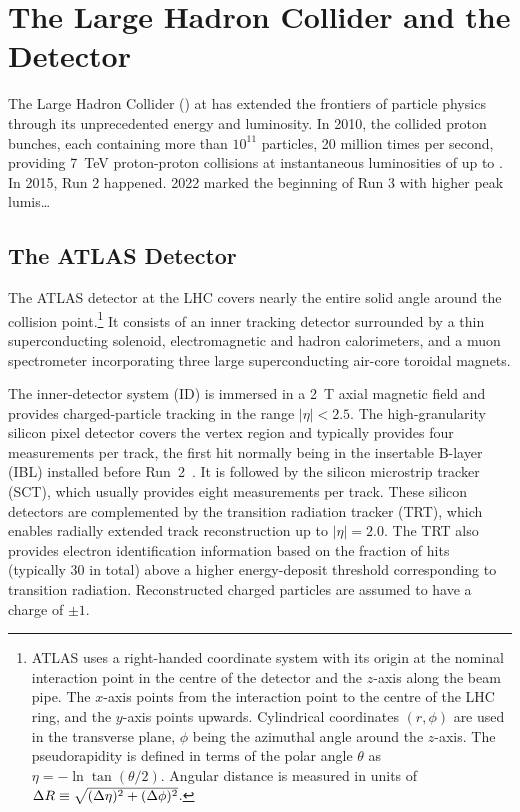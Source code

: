 \chapter{The Large Hadron Collider and the \ATLAS Detector}\label{chap:lhc_atlas}

The Large Hadron Collider (\LHC) at \CERN has extended the frontiers of particle physics through its unprecedented energy and luminosity.
In 2010, the \LHC collided proton bunches, each containing more than $10^{11}$ particles, 20 million times per second, providing \SI{7}{\TeV} proton-proton collisions at instantaneous luminosities of up to \peakLumi.
In 2015, Run 2 happened.
2022 marked the beginning of Run 3 with higher peak lumis\dots


\section{The ATLAS Detector}\label{sec:atlas_detector}

\newcommand{\AtlasCoordFootnote}{%
ATLAS uses a right-handed coordinate system with its origin at the nominal interaction point in the centre of the detector and the \(z\)-axis along the beam pipe. The \(x\)-axis points from the interaction point to the centre of the LHC ring, and the \(y\)-axis points upwards. Cylindrical coordinates \((r,\phi)\) are used in the transverse plane, \(\phi\) being the azimuthal angle around the \(z\)-axis. The pseudorapidity is defined in terms of the polar angle \(\theta\) as \(\eta = -\ln \tan(\theta/2)\). Angular distance is measured in units of \(\DeltaR \equiv \sqrt{(\Delta\eta)^{2} + (\Delta\phi)^{2}}\).}

The ATLAS detector at the LHC covers nearly the entire solid angle around the collision point.\footnote{\AtlasCoordFootnote}
It consists of an inner tracking detector surrounded by a thin superconducting solenoid, electromagnetic and hadron calorimeters,
and a muon spectrometer incorporating three large superconducting air-core toroidal magnets.

The inner-detector system (ID) is immersed in a \SI{2}{\tesla} axial magnetic field 
and provides charged-particle tracking in the range \(|\eta| < 2.5\).
The high-granularity silicon pixel detector covers the vertex region and typically provides four measurements per track, 
the first hit normally being in the insertable B-layer (IBL) installed before Run~2~\cite{ATLAS-TDR-19,PIX-2018-001}.
It is followed by the silicon microstrip tracker (SCT), which usually provides eight measurements per track.
These silicon detectors are complemented by the transition radiation tracker (TRT),
which enables radially extended track reconstruction up to \(|\eta| = 2.0\). 
The TRT also provides electron identification information 
based on the fraction of hits (typically 30 in total) above a higher energy-deposit threshold corresponding to transition radiation.
Reconstructed charged particles are assumed to have a charge of $\pm 1$.

